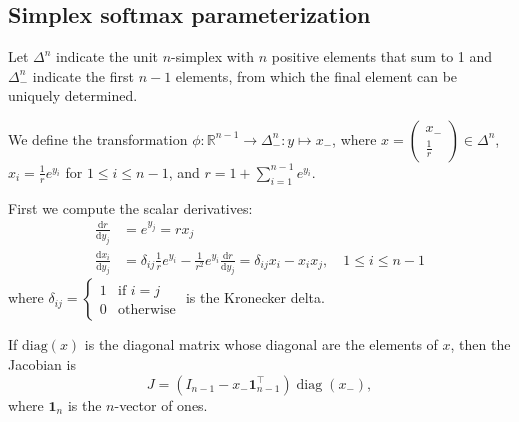 \documentclass[11pt]{article}
\begin{document}
%


\subsection{Simplex softmax parameterization}

Let $\Delta^n$ indicate the unit $n$-simplex with $n$ positive
elements that sum to 1 and $\Delta^n_-$ indicate the first $n-1$
elements, from which the final element can be uniquely determined.

We define the transformation
$\phi: \mathbb{R}^{n-1} \to \Delta^n_-: y \mapsto x_-$, where
$x=\begin{pmatrix}x_- \\ \frac{1}{r}\end{pmatrix} \in \Delta^n$,
$x_i = \frac{1}{r} e^{y_i}$ for $1 \le i \le n-1$, and
$r = 1 + \sum_{i=1}^{n-1} e^{y_i}$.

First we compute the scalar derivatives:
\[
\begin{aligned}
  \frac{\mathrm{d} r}{\mathrm{d} y_j}
  &= e^{y_j} = r x_j\\
  \frac{\mathrm{d} x_i}{\mathrm{d} y_j}
  &= \delta_{ij} \frac{1}{r} e^{y_i} - \frac{1}{r^2} e^{y_i}
  \frac{\mathrm{d} r}{\mathrm{d} y_j}
  = \delta_{ij} x_i - x_i x_j, \quad 1 \le i \le n-1
\end{aligned}
\]
where
$\delta_{ij} = \begin{cases} 1 &\text{if } i = j \\ 0
  &\text{otherwise}\end{cases}$ is the Kronecker delta.

If $\mathrm{diag}(x)$ is the diagonal matrix whose diagonal are the
elements of $x$, then the Jacobian is
\[
  J = (I_{n-1} - x_- \boldsymbol{1}_{n-1}^\top) \operatorname{diag}(x_-),
\]
where $\boldsymbol{1}_n$ is the $n$-vector of ones.
\end{document}
